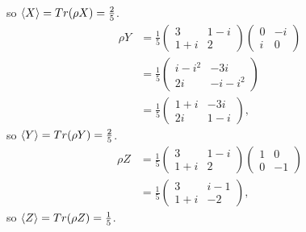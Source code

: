 \documentclass[10pt]{article}
\begin{document}
so $\braket{X} = Tr(\rho X) = \frac{2}{5}$.
\begin{align*}
\rho Y &= \frac{1}{5} \begin{pmatrix}
         3      & 1 - i \\
         1 + i & 2
     \end{pmatrix}
    \begin{pmatrix}
        0 & -i \\
        i & 0 
    \end{pmatrix} \\
&= \frac{1}{5} 
\begin{pmatrix}
i - i^2 & -3i \\
2i        & -i -i^2 
\end{pmatrix} \\
&= \frac{1}{5} \begin{pmatrix}
1 + i & -3i \\
2i     & 1 - i
\end{pmatrix},
\end{align*}
so $\braket{Y} = Tr(\rho Y) = \frac{2}{5}$.
\begin{align*}
\rho Z &= \frac{1}{5} \begin{pmatrix}
         3      & 1 - i \\
         1 + i & 2
     \end{pmatrix}
    \begin{pmatrix}
        1 & 0 \\
        0 & -1 
    \end{pmatrix} \\
&= \frac{1}{5} 
\begin{pmatrix}
  3      & i - 1 \\
  1 + i & -2
\end{pmatrix},
\end{align*}
so $\braket{Z} = Tr(\rho Z) = \frac{1}{5}$.
\end{document}
